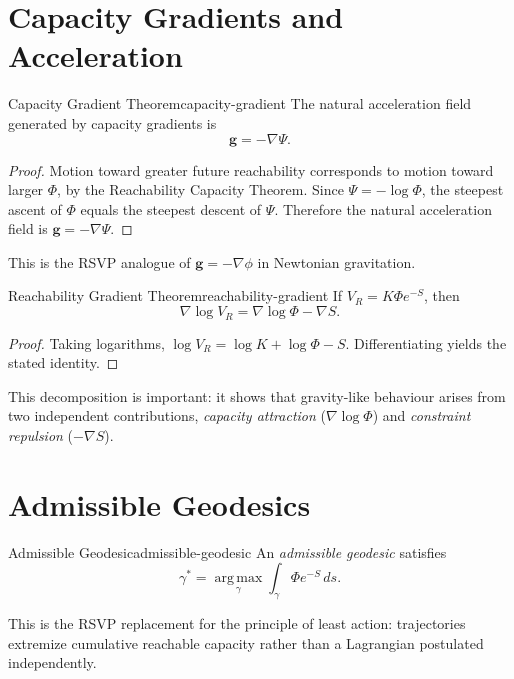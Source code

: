 \documentclass[12pt,twoside,openright]{book}
\begin{document}
\section{Capacity Gradients and Acceleration}
\label{sec:ch17-gradient}

\begin{theorem}{Capacity Gradient Theorem}{capacity-gradient}
  The natural acceleration field generated by capacity
  gradients is
  \[
    \mathbf{g} = -\nabla\Psi.
  \]
\end{theorem}

\begin{proof}
  Motion toward greater future reachability corresponds to
  motion toward larger $\Phi$, by the Reachability Capacity
  Theorem. Since $\Psi = -\log\Phi$, the steepest ascent of
  $\Phi$ equals the steepest descent of $\Psi$. Therefore
  the natural acceleration field is $\mathbf{g} = -\nabla\Psi$.
\end{proof}

This is the RSVP analogue of $\mathbf{g} = -\nabla\phi$ in
Newtonian gravitation.

\begin{theorem}{Reachability Gradient Theorem}{reachability-gradient}
  If $V_R = K\Phi e^{-S}$, then
  \[
    \nabla \log V_R = \nabla\log\Phi - \nabla S.
  \]
\end{theorem}

\begin{proof}
  Taking logarithms, $\log V_R = \log K + \log\Phi - S$.
  Differentiating yields the stated identity.
\end{proof}

This decomposition is important: it shows that
gravity-like behaviour arises from two independent
contributions, \emph{capacity attraction} ($\nabla\log\Phi$)
and \emph{constraint repulsion} ($-\nabla S$).

\section{Admissible Geodesics}
\label{sec:ch17-geodesics}

\begin{definition}{Admissible Geodesic}{admissible-geodesic}
  An \emph{admissible geodesic} satisfies
  \[
    \gamma^* = \operatorname*{arg\,max}_\gamma
    \int_\gamma \Phi e^{-S} \, ds.
  \]
\end{definition}

This is the RSVP replacement for the principle of least
action: trajectories extremize cumulative reachable
capacity rather than a Lagrangian postulated independently.
\end{document}
